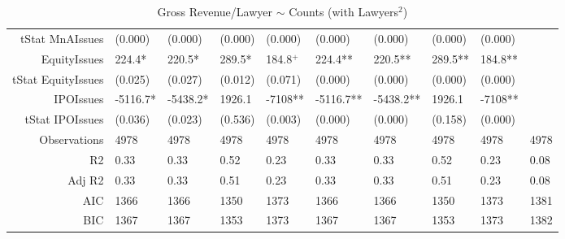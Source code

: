 \begin{table}[ht]
\begin{tabular}{rlllllllll}
  tStat MnAIssues & (0.000) & (0.000) & (0.000) & (0.000) & (0.000) & (0.000) & (0.000) & (0.000) &  \\ 
  EquityIssues & 224.4* & 220.5* & 289.5* & 184.8$^{+}$ & 224.4** & 220.5** & 289.5** & 184.8** &  \\ 
  tStat EquityIssues & (0.025) & (0.027) & (0.012) & (0.071) & (0.000) & (0.000) & (0.000) & (0.000) &  \\ 
  IPOIssues & -5116.7* & -5438.2* & 1926.1 & -7108** & -5116.7** & -5438.2** & 1926.1 & -7108** &  \\ 
  tStat IPOIssues & (0.036) & (0.023) & (0.536) & (0.003) & (0.000) & (0.000) & (0.158) & (0.000) &  \\ 
  Observations & 4978 & 4978 & 4978 & 4978 & 4978 & 4978 & 4978 & 4978 & 4978 \\ 
  R2 & 0.33 & 0.33 & 0.52 & 0.23 & 0.33 & 0.33 & 0.52 & 0.23 & 0.08 \\ 
  Adj R2 & 0.33 & 0.33 & 0.51 & 0.23 & 0.33 & 0.33 & 0.51 & 0.23 & 0.08 \\ 
  AIC & 1366 & 1366 & 1350 & 1373 & 1366 & 1366 & 1350 & 1373 & 1381 \\ 
  BIC & 1367 & 1367 & 1353 & 1373 & 1367 & 1367 & 1353 & 1373 & 1382 \\ 
   \hline
\end{tabular}
\caption{Gross Revenue/Lawyer $\sim$ Counts (with Lawyers$^2$)} 
\end{table}
